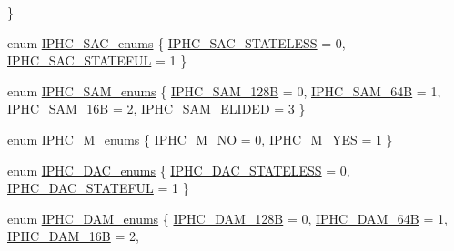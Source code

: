 \begin{DoxyCompactItemize}
 \}
\item 
enum \hyperlink{group___i_p_h_c_ga54eb4faf7603cb807d120898540e176f}{I\+P\+H\+C\+\_\+\+S\+A\+C\+\_\+enums} \{ \hyperlink{group___i_p_h_c_gga54eb4faf7603cb807d120898540e176faf5419386cb8ee9c68cfc802947b434ff}{I\+P\+H\+C\+\_\+\+S\+A\+C\+\_\+\+S\+T\+A\+T\+E\+L\+E\+SS} = 0, 
\hyperlink{group___i_p_h_c_gga54eb4faf7603cb807d120898540e176fa4eb24f475940455398825394450cab73}{I\+P\+H\+C\+\_\+\+S\+A\+C\+\_\+\+S\+T\+A\+T\+E\+F\+UL} = 1
 \}
\item 
enum \hyperlink{group___i_p_h_c_ga03418e20cce3d34c0bd55809817fae8f}{I\+P\+H\+C\+\_\+\+S\+A\+M\+\_\+enums} \{ \hyperlink{group___i_p_h_c_gga03418e20cce3d34c0bd55809817fae8fa36ed450492577a63f390d3bf051c8984}{I\+P\+H\+C\+\_\+\+S\+A\+M\+\_\+128B} = 0, 
\hyperlink{group___i_p_h_c_gga03418e20cce3d34c0bd55809817fae8fac47b1e72e62dc19c31260f3b6d00b086}{I\+P\+H\+C\+\_\+\+S\+A\+M\+\_\+64B} = 1, 
\hyperlink{group___i_p_h_c_gga03418e20cce3d34c0bd55809817fae8fac5d7c07eb7725e9e623b4e27b44c422a}{I\+P\+H\+C\+\_\+\+S\+A\+M\+\_\+16B} = 2, 
\hyperlink{group___i_p_h_c_gga03418e20cce3d34c0bd55809817fae8fa4cd47abd194642036099abd97087474e}{I\+P\+H\+C\+\_\+\+S\+A\+M\+\_\+\+E\+L\+I\+D\+ED} = 3
 \}
\item 
enum \hyperlink{group___i_p_h_c_ga64b8fcf888c919c2d13719ffcf64d322}{I\+P\+H\+C\+\_\+\+M\+\_\+enums} \{ \hyperlink{group___i_p_h_c_gga64b8fcf888c919c2d13719ffcf64d322ae9ede293c533f5defc46e753b2498fc7}{I\+P\+H\+C\+\_\+\+M\+\_\+\+NO} = 0, 
\hyperlink{group___i_p_h_c_gga64b8fcf888c919c2d13719ffcf64d322a81ee2de7c011153decc8668176d6eeb5}{I\+P\+H\+C\+\_\+\+M\+\_\+\+Y\+ES} = 1
 \}
\item 
enum \hyperlink{group___i_p_h_c_gacadc8526b5031d4739074b1e676825a2}{I\+P\+H\+C\+\_\+\+D\+A\+C\+\_\+enums} \{ \hyperlink{group___i_p_h_c_ggacadc8526b5031d4739074b1e676825a2a612c8a78f4fe6a80e403716a19f34a83}{I\+P\+H\+C\+\_\+\+D\+A\+C\+\_\+\+S\+T\+A\+T\+E\+L\+E\+SS} = 0, 
\hyperlink{group___i_p_h_c_ggacadc8526b5031d4739074b1e676825a2af82a93b7fcd84f5f4d5d86e09a6f00e8}{I\+P\+H\+C\+\_\+\+D\+A\+C\+\_\+\+S\+T\+A\+T\+E\+F\+UL} = 1
 \}
\item 
enum \hyperlink{group___i_p_h_c_ga144ca0928b8496c2c689f8333b1bd1bb}{I\+P\+H\+C\+\_\+\+D\+A\+M\+\_\+enums} \{ \hyperlink{group___i_p_h_c_gga144ca0928b8496c2c689f8333b1bd1bbafed57a80fb6fc070089992ddd9176035}{I\+P\+H\+C\+\_\+\+D\+A\+M\+\_\+128B} = 0, 
\hyperlink{group___i_p_h_c_gga144ca0928b8496c2c689f8333b1bd1bbadff87ac250ab25343b3d3e8a5d515a26}{I\+P\+H\+C\+\_\+\+D\+A\+M\+\_\+64B} = 1, 
\hyperlink{group___i_p_h_c_gga144ca0928b8496c2c689f8333b1bd1bba54de2119a7aa248bc306c2b580c230fa}{I\+P\+H\+C\+\_\+\+D\+A\+M\+\_\+16B} = 2, 

\end{DoxyCompactItemize}

